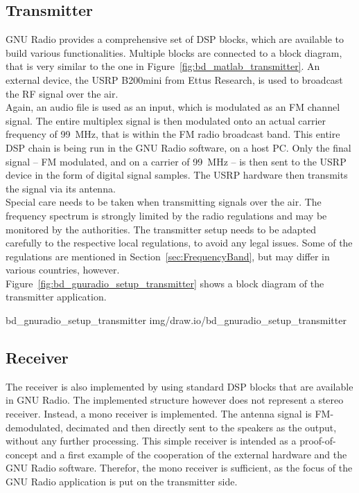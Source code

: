 \subsection{Transmitter}

GNU Radio provides a comprehensive set of DSP blocks, which are available to build various functionalities.
Multiple blocks are connected to a block diagram, that is very similar to the one in Figure~\ref{fig:bd_matlab_transmitter}.
An external device, the USRP B200mini from Ettus Research, is used to broadcast the RF signal over the air.\\

Again, an audio file is used as an input, which is modulated as an FM channel signal.
The entire multiplex signal is then modulated onto an actual carrier frequency of 99~MHz, that is within the FM radio broadcast band.
This entire DSP chain is being run in the GNU Radio software, on a host PC.
Only the final signal -- FM modulated, and on a carrier of 99~MHz -- is then sent to the USRP device in the form of digital signal samples.
The USRP hardware then transmits the signal via its antenna.\\

Special care needs to be taken when transmitting signals over the air.
The frequency spectrum is strongly limited by the radio regulations and may be monitored by the authorities.
The transmitter setup needs to be adapted carefully to the respective local regulations, to avoid any legal issues.
Some of the regulations are mentioned in Section~\ref{sec:FrequencyBand}, but may differ in various countries, however.\\

\noindent
Figure~\ref{fig:bd_gnuradio_setup_transmitter} shows a block diagram of the transmitter application.

 {bd_gnuradio_setup_transmitter} {img/draw.io/bd_gnuradio_setup_transmitter}

\subsection{Receiver}

The receiver is also implemented by using standard DSP blocks that are available in GNU Radio.
The implemented structure however does not represent a stereo receiver.
Instead, a mono receiver is implemented.
The antenna signal is FM-demodulated, decimated and then directly sent to the speakers as the output, without any further processing.
This simple receiver is intended as a proof-of-concept and a first example of the cooperation of the external hardware and the GNU Radio software.
Therefor, the mono receiver is sufficient, as the focus of the GNU Radio application is put on the transmitter side.\\

